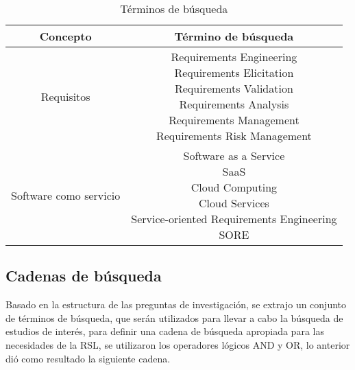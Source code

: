 \documentclass{article}
\begin{document}
\begin{table}[ht]
        \caption{Términos de búsqueda} 
        \centering 
        \begin{tabular}{c c}
                \hline
                Concepto & Término de búsqueda\\ [0.5ex] %
                \hline
                Requisitos             & \makecell{Requirements Engineering \\
                                                   Requirements Elicitation \\
                                                   Requirements Validation \\
                                                   Requirements Analysis \\
                                                   Requirements Management \\
                                                   Requirements Risk Management} \\ 
                \hline 
                Software como servicio & \makecell{Software as a Service \\
                                                   SaaS \\
                                                   Cloud Computing \\
                                                   Cloud Services\\
                                                   Service-oriented Requirements Engineering \\
                                                   SORE } \\[1ex] 
                \hline 
        \end{tabular}
        \label{table:tablaterminos}
\end{table}
\newpage

\subsection{Cadenas de búsqueda}
Basado en la estructura de las preguntas de investigación, se extrajo un conjunto de 
términos de búsqueda, que serán utilizados para llevar a cabo la búsqueda de estudios de interés, 
para definir una cadena de búsqueda apropiada para las necesidades de la RSL, 
se utilizaron los operadores lógicos AND y OR, lo anterior dió como resultado la siguiente cadena.\\
\end{document}
